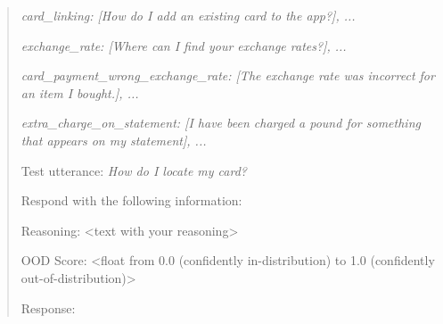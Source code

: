 \begin{quote}
   \textit{card\_linking: [How do I add an existing card to the app?], ...}
   
   \textit{exchange\_rate: [Where can I find your exchange rates?], ...}
   
   \textit{card\_payment\_wrong\_exchange\_rate: [The exchange rate was incorrect for an item I bought.], ...}
   
   \textit{extra\_charge\_on\_statement: [I have been charged a pound for something that appears on my statement], ...}
   
Test utterance: \textit{How do I locate my card?}

Respond with the following information:

Reasoning: <text with your reasoning> 

OOD Score: <float from 0.0 (confidently in-distribution) to 1.0 (confidently out-of-distribution)>

Response:
\end{quote}

